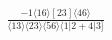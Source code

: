 \documentclass[varwidth, border=5pt]{standalone}
\begin{document}
\begin{my}
$\begin{gathered}
\scriptscriptstyle\frac{-1⟨16⟩[23]⟨46⟩}{⟨13⟩⟨23⟩⟨56⟩⟨1|2+4|3]}
\end{gathered}$
\end{my}
\end{document}
